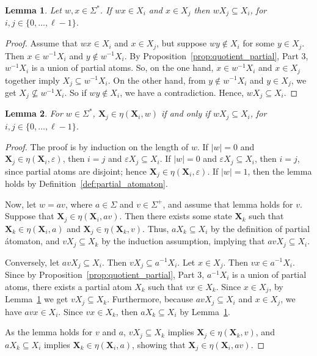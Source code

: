 \documentclass[preprint,12pt]{elsarticle}
\newcommand{\eps}{\varepsilon}
\newcommand{\Sig}{\Sigma}
\newtheorem{lemma}{Lemma}
\begin{document}
\begin{lemma}
\label{lem:inclusion_partial}
Let $w,x\in\Sig^*$.
If $wx\in X_i$ and $x\in X_j$ then $wX_j\subseteq X_i$, for $i,j\in\{0,\ldots,\ell-1\}$.
\end{lemma}
\begin{proof}
Assume that $wx\in X_i$ and $x\in X_j$, but suppose $wy\not\in X_i$ for some  
$y\in X_j$. 
Then $x\in w^{-1}X_i$ and $y\not\in w^{-1}X_i$.
By Proposition~\ref{prop:quotient_partial}, Part 3, $w^{-1}X_i$ is a union of 
partial atoms. So, on the one hand, $x\in w^{-1}X_i$ and $x\in X_j$ together imply 
$X_j\subseteq w^{-1}X_i$. On the other hand, from $y\not\in w^{-1}X_i$ and $y\in X_j$, 
we get $X_j\not\subseteq w^{-1}X_i$. So if $wy\not\in X_i$, we have a contradiction.
Hence, $wX_j\subseteq X_i$. 
\end{proof}

\begin{lemma}
\label{lem:path_partial}
For $w\in \Sig^*$, 
${\mathbf X}_j \in \eta({\mathbf X}_i, w)$ if and only if 
$wX_j \subseteq X_i$, for $i,j\in\{0,\ldots,\ell-1\}$.
\end{lemma}
\begin{proof}  
The proof is by induction on the length of $w$. 
If $|w|=0$ and ${\mathbf X}_j \in \eta({\mathbf X}_i, \eps)$, then $i=j$ and 
$\eps X_j \subseteq X_i$. If $|w|=0$ and $\eps X_j \subseteq X_i$, then $i=j$, 
since partial atoms are disjoint; hence ${\mathbf X}_j \in \eta({\mathbf X}_i, \eps)$.
If $|w|=1$, then the lemma holds by Definition~\ref{def:partial_atomaton}.  

Now, let $w=av$, where $a\in\Sig$ and $v\in\Sig^+$, and assume that 
lemma holds for $v$. 
Suppose that ${\mathbf X}_j \in \eta({\mathbf X}_i, av)$.
Then there exists some state ${\mathbf X}_k$ such that
${\mathbf X}_k \in \eta({\mathbf X}_i, a)$  and 
${\mathbf X}_j \in \eta({\mathbf X}_k, v)$.
Thus,  $aX_k \subseteq X_i$ by the definition of partial \'atomaton, 
and $vX_j \subseteq X_k$ by the induction assumption, implying that
$avX_j \subseteq X_i$.
 
Conversely, let $avX_j \subseteq X_i$. Then $vX_j \subseteq a^{-1}X_i$.
Let $x\in X_j$. Then $vx\in a^{-1}X_i$. 
Since by Proposition~\ref{prop:quotient_partial}, Part 3, $a^{-1}X_i$ is a union 
of partial atoms, there exists a partial atom $X_k$ such that $vx\in X_k$.
Since $x\in X_j$,  by Lemma~\ref{lem:inclusion_partial} we get 
$vX_j \subseteq X_k$.
Furthermore, because $avX_j \subseteq X_i$ and $x\in X_j$, we have 
$avx \in X_i$. Since $vx\in X_k$, then $aX_k \subseteq X_i$ by 
Lemma~\ref{lem:inclusion_partial}.

As the lemma holds for $v$ and $a$, $vX_j \subseteq X_k$ implies
${\mathbf X}_j \in \eta({\mathbf X}_k, v)$, and 
$aX_k \subseteq X_i$ implies
${\mathbf X}_k \in \eta({\mathbf X}_i, a)$, showing that
${\mathbf X}_j \in \eta({\mathbf X}_i, av)$.
\end{proof}
\end{document}
